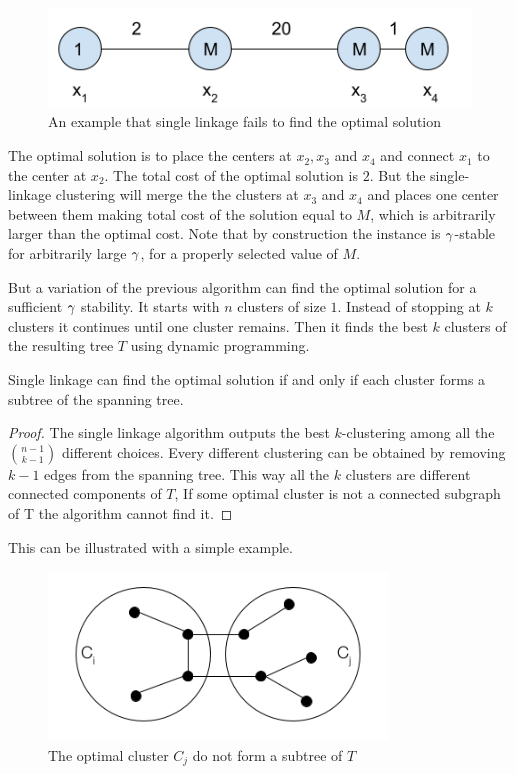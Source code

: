 \begin{figure}[ht]
    \centering
    \includegraphics[width=13cm]{Images/SingleLinkageC.png}
    \caption{An example that single linkage fails to find the optimal solution}
    \label{fig:signleLinkage}
\end{figure}

The optimal solution is to place the centers at $x_2,x_3$ and $x_4$ and connect $x_1$ to the center at $x_2$. The total cost of the optimal solution is $2$. But the single-linkage clustering will merge the the clusters at $x_3$ and $x_4$ and places one center between them making total cost of the solution equal to $M$, which is arbitrarily larger than the optimal cost. Note that by construction the instance is $\gamma$-stable for arbitrarily large $\gamma$, for a properly selected value of $M$.  

But a variation of the previous algorithm can find the optimal solution for a sufficient $\gamma$ stability. It starts with $n$ clusters of size $1$. Instead of stopping at $k$ clusters it continues until one cluster remains. Then it finds the best $k$ clusters of the resulting tree $T$ using dynamic programming. 

\begin{lemma}\label{sl}
Single linkage can find the optimal solution if and only if each cluster forms a subtree of the spanning tree. 
\end{lemma}

\begin{proof}
The single linkage algorithm outputs the best $k$-clustering among all the $\binom{n-1}{k-1}$ different choices. Every different clustering can be obtained by removing $k-1$ edges from the spanning tree. This way all the $k$ clusters are different connected components of  $T$, If some optimal cluster is not a connected subgraph of T the algorithm cannot find it.
\end{proof}
This can be illustrated with a simple example. 

\begin{figure}[ht]
    \centering
    \includegraphics[width=9cm]{Images/MST.png}
    \caption{The optimal cluster $C_j$ do not form a subtree of $T$}
    \label{fig:my_label}
\end{figure}


